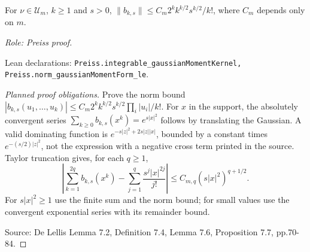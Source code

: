 \begin{lemma}
\label{lem:moment-norm-bound}








For $\nu\in\mathcal U_m$, $k\geq1$ and $s>0$, $\|b_{k,s}\|\leq C_m 2^k k^{k/2}s^{k/2}/k!$, where $C_m$ depends only on $m$.
\par\emph{Role: Preiss proof.}
\par Lean declarations: \texttt{Preiss.integrable\_gaussianMomentKernel, Preiss.norm\_gaussianMomentForm\_le}.
\end{lemma}
\begin{proof}[Planned proof obligations]

Prove the norm bound
$|b_{k,s}(u_1,\ldots,u_k)|\leq
C_m 2^k k^{k/2}s^{k/2}\prod_i|u_i|/k!$.
For $x$ in the support, the absolutely convergent series
$\sum_{k\geq0} b_{k,s}(x^k)=e^{s|x|^2}$ follows by translating the
Gaussian. A valid dominating function is
$e^{-s|z|^2+2s|z||x|}$, bounded by a constant times
$e^{-(s/2)|z|^2}$, not the expression with a negative cross term printed in
the source. Taylor truncation gives, for each $q\geq1$,
\[
 \left|\sum_{k=1}^{2q}b_{k,s}(x^k)
 -\sum_{j=1}^{q}\frac{s^j|x|^{2j}}{j!}\right|
 \leq C_{m,q}(s|x|^2)^{q+1/2}.
\]
For $s|x|^2\geq1$ use the finite sum and the norm bound; for small values use
the convergent exponential series with its remainder bound.
\par Source: De Lellis Lemma 7.2, Definition 7.4, Lemma 7.6, Proposition 7.7, pp.70-84.
\end{proof}

